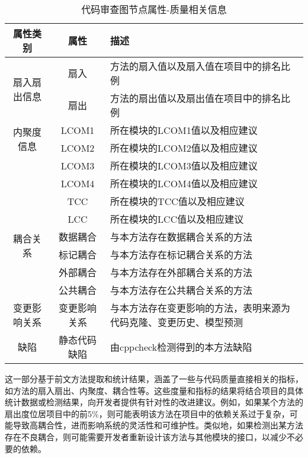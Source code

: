 \begin{table}[htbp]
    \caption{代码审查图节点属性-质量相关信息}
    \vspace{0.5em}\centering\wuhao
    \begin{tabular}{ccp{9cm}}
    \toprule
    属性类别 & 属性 & 描述 \\
    \midrule
    \multirow{2}{*}{扇入扇出信息}& 扇入 &  方法的扇入值以及扇入值在项目中的排名比例 \\       
                                & 扇出 &  方法的扇出值以及扇出值在项目中的排名比例 \\   \cline{2-3}
    \multirow{2}{*}{内聚度信息}& LCOM1 &  所在模块的LCOM1值以及相应建议 \\       
                                & LCOM2 &  所在模块的LCOM2值以及相应建议 \\    
                                & LCOM3 &  所在模块的LCOM3值以及相应建议 \\    
                                & LCOM4 &  所在模块的LCOM4值以及相应建议 \\    
                                & TCC &  所在模块的TCC值以及相应建议 \\    
                                & LCC &  所在模块的LCC值以及相应建议 \\   \cline{2-3}             
    \multirow{2}{*}{耦合关系}& 数据耦合 &  与本方法存在数据耦合关系的方法 \\       
                                & 标记耦合 &  与本方法存在标记耦合关系的方法 \\   
                                & 外部耦合 &  与本方法存在外部耦合关系的方法 \\   
                                & 公共耦合 &  与本方法存在公共耦合关系的方法 \\   \cline{2-3}
    变更影响关系 & 变更影响关系 &  与本方法存在变更影响的方法，表明来源为代码克隆、变更历史、模型预测 \\    \cline{2-3}
    缺陷 & 静态代码缺陷 &  由cppcheck检测得到的本方法缺陷 \\      
    \bottomrule
    \end{tabular}
    \end{table}

这一部分基于前文方法提取和统计结果，涵盖了一些与代码质量直接相关的指标，如方法的扇入扇出、内聚度、耦合性等。这些度量和指标的结果将结合项目的具体统计数据或检测结果，向开发者提供有针对性的改进建议。例如，如果某个方法的扇出度位居项目中的前5\%，则可能表明该方法在项目中的依赖关系过于复杂，可能导致高耦合性，进而影响系统的灵活性和可维护性。类似地，如果检测出某方法存在不良耦合，则可能需要开发者重新设计该方法与其他模块的接口，以减少不必要的依赖。

